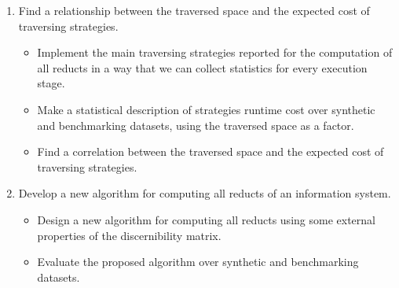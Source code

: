 \documentclass[authoryear,11pt]{elsarticle}
\begin{document}
\begin{enumerate}
\begin{itemize}
  	\end{itemize}
  	\item Find a relationship between the traversed space and the expected cost of traversing strategies.
  	\begin{itemize}
  		\item Implement the main traversing strategies reported for the computation of all reducts in a way
  			  that we can collect statistics for every execution stage.
  		\item Make a statistical description  of strategies runtime cost over synthetic and benchmarking datasets,
  			  using the traversed space as a factor.
  		\item Find a correlation between the traversed space and the expected cost of traversing strategies.
  	\end{itemize}
  	\item Develop a new algorithm for computing all reducts of an information system.
  	\begin{itemize}
  		\item Design a new algorithm for computing all reducts using some external
  		      properties of the discernibility matrix.
  		\item Evaluate the proposed algorithm over synthetic and benchmarking datasets.
  	\end{itemize}
  	

\end{enumerate}
\end{document}
